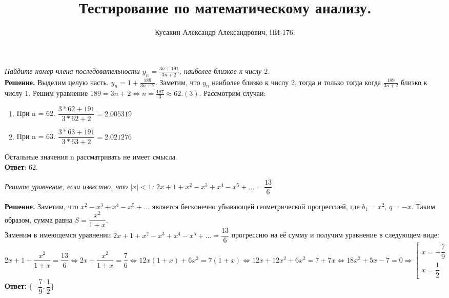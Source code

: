 \documentclass[a4paper, 10pt]{article}
\title{
	Тестирование по математическому анализу.
}
\author{Кусакин Александр Александрович, ПИ-176.
}
\date{}
\newcommand{\D}{\displaystyle}
\begin{document}
\maketitle
\begin{spacing}{1}

	
\begin{center}
\end{center}
		
\noindent \textit{Найдите номер члена последовательности $\displaystyle y_n = \frac{3n+191}{3n+2}$, наиболее близкое к числу $2$.
}\\
\noindent \textbf{Решение.} Выделим целую часть. $\D y_n = 1 + \frac{189}{3n+2}$. Заметим, что $y_n$ наиболее близко к числу 2, тогда и только тогда когда $\D \frac{189}{3n + 2}$ близко к числу 1. Решим уравнение $\D 189 = 3n+2 \Leftrightarrow n = \frac{187}{3} \approx 62.(3)$. Рассмотрим случаи:
\begin{enumerate}
	\item При n = 62. $\dfrac{3*62+191}{3*62+2} = 2.005319$
	\item При n = 63. $\dfrac{3*63+191}{3*63+2} = 2.021276$
\end{enumerate}
Остальные значения n рассматривать не имеет смысла.\\
\noindent \textbf{Ответ}: 62.

\begin{center}
\end{center}

\noindent \textit{Решите уравнение, если известно, что $|x|<1$: $2x+1+x^2-x^3+x^4-x^5+...=\dfrac{13}{6}$}

\noindent \textbf{Решение.} Заметим, что $x^2-x^3+x^4-x^5+...$ является бесконечно убывающей геометрической прогрессией, где $b_1 = x^2$, $q = -x$. Таким образом, сумма равна $S = \dfrac{x^2}{1+x}$. \\
Заменим в имеющемся уравнении $2x+1+x^2-x^3+x^4-x^5+...=\dfrac{13}{6}$ прогрессию на её сумму и получим уравнение в следующем виде: $2x+1 + \dfrac{x^2}{1+x} = \dfrac{13}{6} \Leftrightarrow 2x + \dfrac{x^2}{1+x} = \dfrac{7}{6} \Leftrightarrow 12x(1+x) + 6x^2 = 7(1+x) \Leftrightarrow 12x + 12x^2 + 6x^2 = 7+ 7x \Leftrightarrow 18x^2+5x-7=0 \Rightarrow \left[\begin{array}{l}
	x = -\dfrac{7}{9}\\
	x = \dfrac{1}{2}
\end{array}\right.$\\
\textbf{Ответ:} $\{-\dfrac{7}{9}, \dfrac{1}{2}\}$


\end{spacing}
\end{document}
